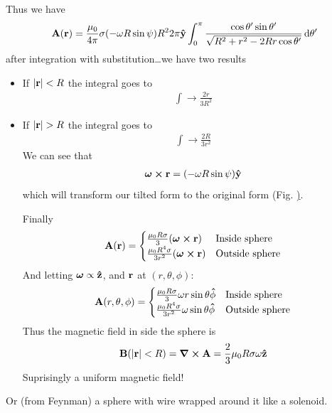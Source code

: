 \documentclass[../main.tex]{subfiles}
\begin{document}
Thus we have 
\begin{align*}
    \vb A (\vb r) = \frac{\mu_0}{4\pi} \sigma (-\omega R \sin\psi) R^2 2\pi \vu y
    \int_0^\pi \frac{\cos\theta'\sin\theta'}{\sqrt{R^2 + r^2 - 2Rr\cos\theta'}} \dd{\theta'}
\end{align*}
after integration with substitution\dots we have two results
\begin{itemize}
    \item If $\abs{\vb r} < R$ the integral goes to
    \begin{align*}
        \int \to \frac{2r}{3R^2}
    \end{align*}
    \item If $\abs{\vb r} > R$ the integral goes to
    \begin{align*}
        \int \to \frac{2R}{3r^2}
    \end{align*}
    We can see that
    \begin{align*}
        \vb*\omega \cross \vb r = (-\omega R \sin\psi) \vu y
    \end{align*}
    which will transform our tilted form to the original form (Fig. \href{fig:fig5_48}).

    Finally
    \begin{align*}
        \vb A (\vb r) = \begin{cases}
            \frac{\mu_0 R \sigma}{3} (\vb*\omega \cross \vb r) & \text{Inside sphere} \\
            \frac{\mu_0 R^4 \sigma}{3r^2} (\vb*\omega \cross \vb r) & \text{Outside sphere}
        \end{cases}
    \end{align*}
    And letting $\vb*\omega \propto \vu z$, and $\vb r$ at $(r, \theta, \phi)$:
    \begin{align*}
        \vb A (r, \theta, \phi) = \begin{cases}
            \frac{\mu_0 R \sigma}{3} \omega r \sin\theta \vu \phi & \text{Inside sphere} \\
            \frac{\mu_0 R^4 \sigma}{3r^2} \omega \sin\theta \vu \phi & \text{Outside sphere}
        \end{cases}
    \end{align*}
    Thus the magnetic field in side the sphere is
    \begin{align*}
        \vb B(\abs{\vb r} < R) = \curl \vb A = \frac{2}{3} \mu_0 R \sigma \omega \vu{z}
    \end{align*}
    Suprisingly a uniform magnetic field!
\end{itemize}
Or (from Feynman) a sphere with wire wrapped around it like a solenoid.
\end{document}

